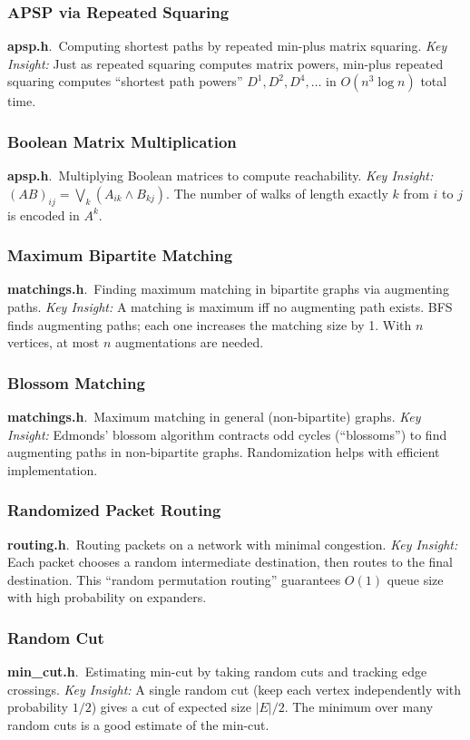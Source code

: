 \documentclass[11pt,a4paper]{article}
\newcommand{\algo}[2]{\textbf{#1}.\ #2}
\newcommand{\insight}{\textit{Key Insight: }}
\begin{document}
\subsubsection{APSP via Repeated Squaring}
\algo{apsp.h}{Computing shortest paths by repeated min-plus matrix squaring.}
\insight Just as repeated squaring computes matrix powers, min-plus repeated squaring computes ``shortest path powers'' \(D^1, D^2, D^4, \ldots\) in \(O(n^3 \log n)\) total time.

\subsubsection{Boolean Matrix Multiplication}
\algo{apsp.h}{Multiplying Boolean matrices to compute reachability.}
\insight \( (AB)_{ij} = \bigvee_k (A_{ik} \wedge B_{kj}) \). The number of walks of length exactly \(k\) from \(i\) to \(j\) is encoded in \(A^k\).

\subsubsection{Maximum Bipartite Matching}
\algo{matchings.h}{Finding maximum matching in bipartite graphs via augmenting paths.}
\insight A matching is maximum iff no augmenting path exists. BFS finds augmenting paths; each one increases the matching size by 1. With \(n\) vertices, at most \(n\) augmentations are needed.

\subsubsection{Blossom Matching}
\algo{matchings.h}{Maximum matching in general (non-bipartite) graphs.}
\insight Edmonds' blossom algorithm contracts odd cycles (``blossoms'') to find augmenting paths in non-bipartite graphs. Randomization helps with efficient implementation.

\subsubsection{Randomized Packet Routing}
\algo{routing.h}{Routing packets on a network with minimal congestion.}
\insight Each packet chooses a random intermediate destination, then routes to the final destination. This ``random permutation routing'' guarantees \(O(1)\) queue size with high probability on expanders.

\subsubsection{Random Cut}
\algo{min\_cut.h}{Estimating min-cut by taking random cuts and tracking edge crossings.}
\insight A single random cut (keep each vertex independently with probability \(1/2\)) gives a cut of expected size \(|E|/2\). The minimum over many random cuts is a good estimate of the min-cut.
\end{document}
